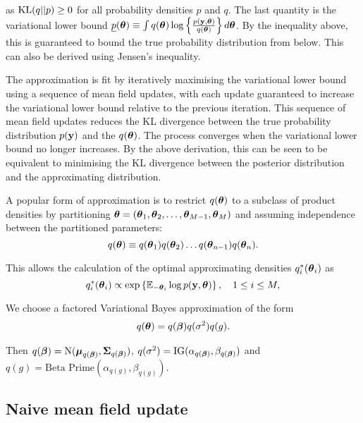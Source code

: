 \documentclass{amsart}[12pt]
\begin{document}
\noindent as $\text{KL}(q||p) \geq 0$ for all probability densities $p$ and $q$. The last quantity is the
variational lower bound $\underline{p}({\boldsymbol \theta}) \equiv \int q({\boldsymbol \theta}) \log\left\{ \frac{p({\bf y},
{\boldsymbol \theta})}{q({\boldsymbol \theta})} \right\} d{\boldsymbol \theta}$. By the inequality above, this is guaranteed to bound the true
probability distribution from below. This can also be derived using Jensen's inequality.

The approximation is fit by iteratively maximising the variational lower bound using a sequence of mean field
updates, with each update guaranteed to increase the variational lower bound relative to the previous
iteration. This sequence of mean field updates reduces the KL divergence between the true probability
distribution $p({\bf y})$ and the $q({\boldsymbol \theta})$. The process converges when the variational lower bound no longer
increases. By the above derivation, this can be seen to be equivalent to minimising the KL divergence between
the posterior distribution and the approximating distribution.

A popular form of approximation is to restrict $q({\boldsymbol \theta})$ to a subclass of product densities by partitioning
${\boldsymbol \theta} = ({\boldsymbol \theta}_1, {\boldsymbol \theta}_2, \ldots, {\boldsymbol \theta}_{M-1}, {\boldsymbol \theta}_M)$ and assuming independence between the
partitioned parameters:
\begin{equation*}
	q({\boldsymbol \theta}) \equiv q({\boldsymbol \theta}_1) q({\boldsymbol \theta}_2) \ldots q({\boldsymbol \theta}_{n-1}) q({\boldsymbol \theta}_n).
\end{equation*}

\noindent This allows the calculation of the optimal approximating densities $q_i^*({\boldsymbol \theta}_i)$ as
\begin{equation*}
	q_i^*({\boldsymbol \theta}_i) \propto \exp \left \{ \mathbb{E}_{-{\boldsymbol \theta}_i} \log p({\bf y}, {\boldsymbol \theta}) \right \}, \quad 1 \leq i \leq M,
\end{equation*}

\noindent We choose a factored Variational Bayes approximation of the form
\begin{align*}
	q({\boldsymbol \theta}) = q({\boldsymbol \beta}) q(\sigma^2) q(g). 
\end{align*}

\noindent Then $q({\boldsymbol \beta}) = \text{N}({\boldsymbol \mu}_{q({\boldsymbol \beta})}, {\boldsymbol \Sigma}_{q({\boldsymbol \beta})})$, $q(\sigma^2) = \text{IG}(\alpha_{q({\boldsymbol \beta})}, \beta_{q({\boldsymbol \beta})})$ and $q(g) = \text{Beta Prime}(\alpha_{q(g)}, \beta_{q(g)})$.

\subsection{Naive mean field update}
\label{sec:naive_mean_field_updates}
\end{document}
